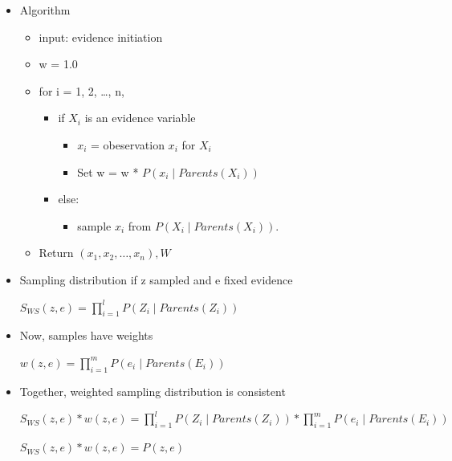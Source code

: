 \documentclass[11pt,a4paper]{report}
\begin{document}
\begin{itemize}
    \item Algorithm
        \begin{itemize}
            \item input: evidence initiation
            \item w = 1.0
            \item for i = 1, 2, \ldots, n, \\
               \begin{itemize}
                    \item if $X_{i}$ is an evidence variable
                        \begin{itemize}
                            \item $x_{i}$ = obeservation $x_{i}$ for $X_{i}$
                            \item Set w = w * $P(x_{i} \mid Parents(X_{i}))$
                        \end{itemize}
                    \item else:
                        \begin{itemize}
                            \item sample $x_{i}$ from $P(X_{i} \mid Parents(X_{i}))$.
                        \end{itemize}
                \end{itemize}
            \item Return $(x_{1}, x_{2}, \ldots, x_{n}), W$
        \end{itemize}
    
    \item Sampling distribution if z sampled and e fixed evidence
    \begin{center}
        $S_{W S}(z, e) = \prod_{i=1}^{l}P(Z_{i} \mid Parents(Z_{i}))$
    \end{center}
    \item Now, samples have weights
    \begin{center}
        $w(z, e) = \prod_{i=1}^{m}P(e_{i} \mid Parents(E_{i}))$
    \end{center}
    \item Together, weighted sampling distribution is consistent
    \begin{center}
        $S_{W S}(z, e) * w(z, e) = \prod_{i=1}^{l}P(Z_{i} \mid Parents(Z_{i})) *  \prod_{i=1}^{m}P(e_{i} \mid Parents(E_{i}))$

        $S_{W S}(z, e) * w(z, e) = P(z, e)$
    \end{center}


\end{itemize}
\end{document}
